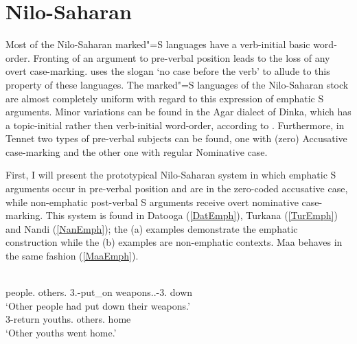 
\section{Nilo-Saharan}\label{EmphNilo}

Most of the Nilo-Saharan marked"=S languages have a verb-initial basic word-order. 
Fronting of an argument to pre-verbal position leads to the loss of any overt case-marking. \citet{Koenig:2008} uses the slogan `no case before the verb' to allude to this property of these languages.  
The marked"=S languages of the Nilo-Saharan stock are almost completely uniform with regard to this expression of emphatic S arguments. 
Minor variations can be found in the Agar dialect of Dinka, which has a topic-initial rather then verb-initial word-order, according to \citet{Andersen:1991}. 
Furthermore, in Tennet two types of pre-verbal subjects can be found, one with (zero) Accusative case-marking and the other one with regular Nominative case.

First, I will present the prototypical Nilo-Saharan system in which emphatic S arguments occur in pre-verbal position and are in the zero-coded accusative case, while non-emphatic post-verbal S arguments receive overt nominative case-marking. 
This system is found in Datooga (\ref{DatEmph}), Turkana (\ref{TurEmph}) and Nandi (\ref{NanEmph}); the (a) examples demonstrate the emphatic construction while the (b) examples are non-emphatic contexts. Maa behaves in the same fashion (\ref{MaaEmph}).

\begin{exe}\ex\label{DatEmph}
\begin{xlist} 
\ex\gll {}     \\
people.\acc{} others.\acc{} \topic{} \sbj{}3.\prf{}-put\_on weapons.\acc{}.\cs{}-3\pl{}.\poss{} down\\
\glt `Other people had put down their weapons.'
\ex\gll {}   \\
\sbj{}3-return youths.\nom{} others.\nom{} home\\
\glt `Other youths went home.'
\end{xlist}
\end{exe}

